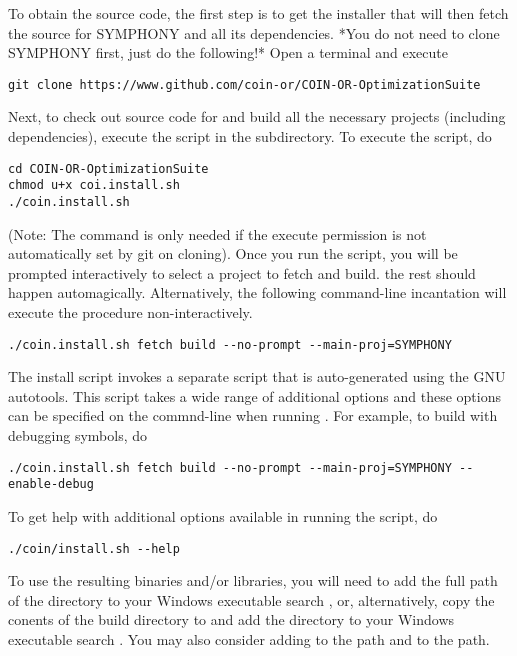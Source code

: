 To obtain the source code, the first step is to get the installer that will then
fetch the source for SYMPHONY and all its dependencies. *You do not need to
clone SYMPHONY first, just do the following!* Open a terminal and execute

{\color{Brown}
\begin{verbatim}
git clone https://www.github.com/coin-or/COIN-OR-OptimizationSuite
\end{verbatim}
}

Next, to check out source code for and build all the necessary projects
(including dependencies), execute the script in the 
subdirectory. To execute the script, do

{\color{Brown}
\begin{verbatim}
cd COIN-OR-OptimizationSuite
chmod u+x coi.install.sh
./coin.install.sh
\end{verbatim}
}

(Note: The  command is only needed if the execute permission is not
automatically set by git on cloning). Once you run the script,
you will be prompted interactively to select a project to fetch and build. the
rest should happen automagically. Alternatively, the following command-line
incantation will execute the procedure non-interactively.

{\color{Brown}
\begin{verbatim}
./coin.install.sh fetch build --no-prompt --main-proj=SYMPHONY
\end{verbatim}
}
The install script invokes a separate  script that is
auto-generated using the GNU autotools. This script takes a wide range of
additional options and these options can be specified on the commnd-line when
running . For example, to build with debugging symbols,
do

{\color{Brown}
\begin{verbatim}
./coin.install.sh fetch build --no-prompt --main-proj=SYMPHONY --enable-debug
\end{verbatim}
}

To get help with additional options available in running the script, do

{\color{Brown}
\begin{verbatim}
./coin/install.sh --help
\end{verbatim}
}

To use the resulting binaries and/or libraries, you will need to add the
full path of the directory  to your Windows executable
search , or, alternatively, copy the conents of the build directory to 
 and add the directory  
to your Windows executable search . You may also consider adding
 to the  path and 
 to the  path. 

